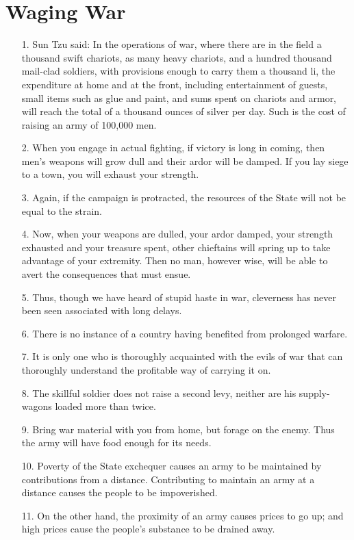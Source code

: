 \documentclass[11pt,openany]{memoir}
\newcommand{\enumeratemargin}{1.30em}
\begin{document}
\chapter{Waging War}
\begin{enumerate}[leftmargin=\enumeratemargin]
\item[1.] Sun Tzu said: In the operations of war, where there are in the field a thousand swift chariots, as many heavy chariots, and a hundred thousand mail-clad soldiers, with provisions enough to carry them a thousand li, the expenditure at home and at the front, including entertainment of guests, small items such as glue and paint, and sums spent on chariots and armor, will reach the total of a thousand ounces of silver per day. Such is the cost of raising an army of 100,000 men.
\item[2.] When you engage in actual fighting, if victory is long in coming, then men's weapons will grow dull and their ardor will be damped. If you lay siege to a town, you will exhaust your strength.
\item[3.] Again, if the campaign is protracted, the resources of the State will not be equal to the strain.
\item[4.] Now, when your weapons are dulled, your ardor damped, your strength exhausted and your treasure spent, other chieftains will spring up to take advantage of your extremity. Then no man, however wise, will be able to avert the consequences that must ensue.
\item[5.] Thus, though we have heard of stupid haste in war, cleverness has never been seen associated with long delays.
\item[6.] There is no instance of a country having benefited from prolonged warfare.
\item[7.] It is only one who is thoroughly acquainted with the evils of war that can thoroughly understand the profitable way of carrying it on.
\item[8.] The skillful soldier does not raise a second levy, neither are his supply-wagons loaded more than twice.
\item[9.] Bring war material with you from home, but forage on the enemy. Thus the army will have food enough for its needs.
\item[10.] Poverty of the State exchequer causes an army to be maintained by contributions from a distance. Contributing to maintain an army at a distance causes the people to be impoverished.
\item[11.] On the other hand, the proximity of an army causes prices to go up; and high prices cause the people's substance to be drained away.

\end{enumerate}
\end{document}

